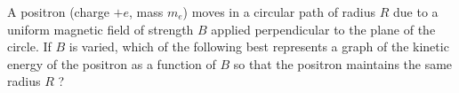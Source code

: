 \begin{questions}\setcounter{question}{5}\question
A positron (charge $+e$, mass $m_{e}$) moves in a circular path of radius $R$ due to a uniform magnetic field of strength $B$ applied perpendicular to the plane of the circle. If $B$ is varied, which of the following best represents a graph of the kinetic energy of the positron as a function of $B$ so that the positron maintains the same radius $R$ ?

\begin{oneparchoices}
\choice {}
\choice {}

\end{oneparchoices}
\end{questions}
